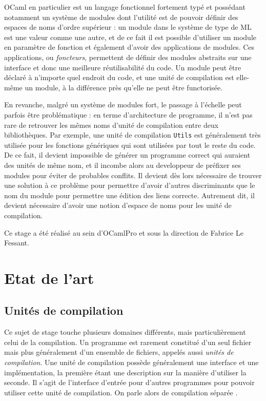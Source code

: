 \documentclass[11pt,a4paper]{report}
\begin{document}
OCaml en particulier est un langage fonctionnel fortement typé et possédant
notamment un système de modules dont l'utilité est de pouvoir définir des
espaces de noms d'ordre supérieur : un module dans le système de type de ML est
une valeur comme une autre, et de ce fait il est possible d'utiliser un module
en paramètre de fonction et également d'avoir des applications de modules. Ces
applications, ou \emph{foncteurs}, permettent de définir des modules abstraits
sur une interface et donc une meilleure réutilisabilité du code. Un module peut
être déclaré à n'importe quel endroit du code, et une unité de compilation est
elle-même un module, à la différence près qu'elle ne peut être functorisée.

En revanche, malgré un système de modules fort, le passage à l'échelle peut
parfois être problématique : en terme d'architecture de programme, il n'est pas
rare de retrouver les mêmes noms d'unité de compilation entre deux
bibliothèques. Par exemple, une unité de compilation \texttt{Utils} est
généralement très utilisée pour les fonctions génériques qui sont utilisées par
tout le reste du code. De ce fait, il devient impossible de générer un programme
correct qui auraient des unités de même nom, et il incombe alors au developpeur
de préfixer ses modules pour éviter de probables conflits. Il devient dès lors
nécessaire de trouver une solution à ce problème pour permettre d'avoir d'autres
discriminants que le nom du module pour permettre une édition des liens
correcte. Autrement dit, il devient nécessaire d'avoir une notion d'espace de
noms pour les unité de compilation.

Ce stage a été réalisé au sein d'OCamlPro et sous la direction de Fabrice Le
Fessant.

\chapter{Etat de l'art}

\section{Unités de compilation}

Ce sujet de stage touche plusieurs domaines différents, mais particulièrement
celui de la compilation. Un programme est rarement constitué d'un seul fichier
mais plus généralement d'un ensemble de fichiers, appelés aussi \emph{unités de
  compilation}. Une unité de compilation possède généralement une interface et
une implémentation, la première étant une description sur la manière d'utiliser
la seconde. Il s'agit de l'interface d'entrée pour d'autres programmes pour
pouvoir utiliser cette unité de compilation. On parle alors de compilation
séparée \cite{Cardelli97programfragments}. 
\end{document}
